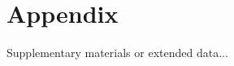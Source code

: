 \documentclass[12pt,a4paper]{article}
\begin{document}



 
\appendix
\section{Appendix}
\label{sec:appendix}
Supplementary materials or extended data...
\end{document}
